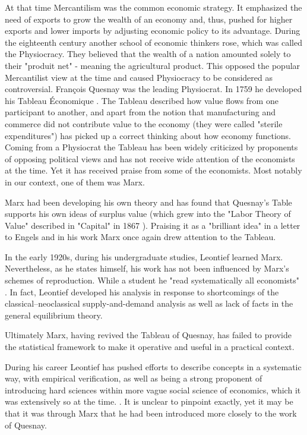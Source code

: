 \documentclass[12pt,a4paper]{scrartcl}
\begin{document}
	At that time Mercantilism was the common economic strategy. It emphasized the need of exports to grow the wealth of an economy and, thus, pushed for higher exports and lower imports by adjusting economic policy to its advantage. During the eighteenth century another school of economic thinkers rose, which was called the Physiocracy. They believed that the wealth of a nation amounted solely to their "produit net" - meaning the agricultural product. This opposed the popular Mercantilist view at the time and caused Physiocracy to be considered as controversial. François Quesnay was the leading Physiocrat. In 1759 he developed his Tableau Économique . The Tableau described how value flows from one participant to another, and apart from the notion that manufacturing and commerce did not contribute value to the economy (they were called "sterile expenditures") has picked up a correct thinking about how economy functions. Coming from a Physiocrat the Tableau has been widely criticized by proponents of opposing political views and has not receive wide attention of the economists at the time. Yet it has received praise from some of the economists. Most notably in our context, one of them was Marx. \cite[pp.724-732]{Miller2009}
	
	Marx had been developing his own theory and has found that Quesnay's Table supports his own ideas of surplus value (which grew into the "Labor Theory of Value" described in "Capital" in 1867 \cite[]{Marx1887}). Praising it as a "brilliant idea" in a letter to Engels \cite[p.144]{Baumol2000} and in his work Marx once again drew attention to the Tableau.
	
	In the early 1920s, during his undergraduate studies, Leontief learned Marx. Nevertheless, as he states himself, his work has not been influenced by Marx's schemes of reproduction. While a student he "read systematically all economists" \cite[p. 53]{Hamilton2008}. In fact, Leontief developed his analysis in response to shortcomings of the classical–neoclassical supply-and-demand analysis as well as lack of facts in the general equilibrium theory.
	
	Ultimately Marx, having revived the Tableau of Quesnay, has failed to provide the statistical framework to make it operative and useful in a practical context. \cite[p.232]{Schumpeter1954} 
	
	During his career Leontief has pushed efforts to describe concepts in a systematic way, with empirical verification, as well as being a strong proponent of introducing hard sciences within more vague social science of economics, which it was extensively so at the time. . It is unclear to pinpoint exactly, yet it may be that it was through Marx that he had been introduced more closely to the work of Quesnay.
	
\end{document}
